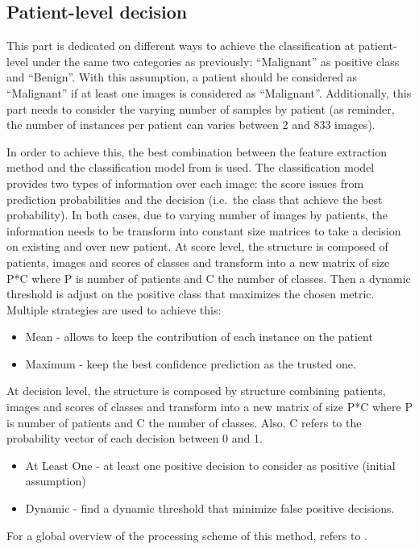 \documentclass[journal,article,submit,moreauthors,pdftex, applsci]{Definitions/mdpi}
\begin{document}
\subsection{Patient-level decision}
\label{sec:patient_decision}
This part is dedicated on different ways to achieve the classification at patient-level under the same two categories as previously: “Malignant” as positive class and “Benign”. With this assumption, a patient should be considered as “Malignant” if at least one images is considered as “Malignant”. Additionally, this part needs to consider the varying number of samples by patient (as reminder, the number of instances per patient can varies between 2 and 833 images).\par
In order to achieve this, the best combination between the feature extraction method and the classification model from  is used. The classification model provides two types of information over each image: the score issues from prediction probabilities and the decision (i.e.\ the class that achieve the best probability). In both cases, due to varying number of images by patients, the information needs to be transform into constant size matrices to take a decision on existing and over new patient. At score level, the structure is composed of patients, images and scores of classes and transform into a new matrix of size P*C where P is number of patients and C the number of classes. Then a dynamic threshold is adjust on the positive class that maximizes the chosen metric. Multiple strategies are used to achieve this:
\begin{itemize}
\item Mean - allows to keep the contribution of each instance on the patient
\item Maximum - keep the best confidence prediction as the trusted one.
\end{itemize}
At decision level, the structure is composed by structure combining patients, images and scores of classes and transform into a new matrix of size P*C where P is number of patients and C the number of classes. Also, C refers to the probability vector of each decision between 0 and 1. 
\begin{itemize}
\item At Least One - at least one positive decision to consider as positive (initial assumption)
\item Dynamic - find a dynamic threshold that minimize false positive decisions.
\end{itemize}
For a global overview of the processing scheme of this method, refers to .
\end{document}
